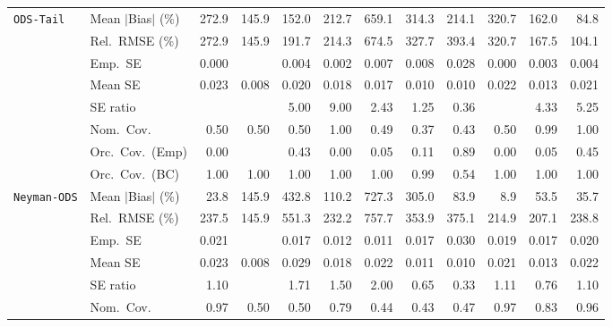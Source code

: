 \begin{landscape}
\begin{longtable}{llrrrrrrrrrr}
\addlinespace[2pt]
\quad \texttt{ODS-Tail} & Mean $|$Bias$|$ (\%) & 272.9 & \cellcolor{ranktwo}145.9 & \cellcolor{rankthree}152.0 & 212.7 & 659.1 & 314.3 & 214.1 & 320.7 & 162.0 & \cellcolor{rankone}84.8 \\
 & Rel.\ RMSE (\%) & 272.9 & \cellcolor{ranktwo}145.9 & 191.7 & 214.3 & 674.5 & 327.7 & 393.4 & 320.7 & \cellcolor{rankthree}167.5 & \cellcolor{rankone}104.1 \\
 & Emp.\ SE & 0.000 &  & 0.004 & 0.002 & 0.007 & 0.008 & 0.028 & 0.000 & 0.003 & 0.004 \\
 & Mean SE & 0.023 & 0.008 & 0.020 & 0.018 & 0.017 & 0.010 & 0.010 & 0.022 & 0.013 & 0.021 \\
 & SE ratio &  &  & 5.00 & 9.00 & \cellcolor{rankthree}2.43 & \cellcolor{rankone}1.25 & \cellcolor{ranktwo}0.36 &  & 4.33 & 5.25 \\
 & Nom.\ Cov. & \cellcolor{rankthree}0.50 & \cellcolor{rankthree}0.50 & \cellcolor{rankthree}0.50 & \cellcolor{ranktwo}1.00 & 0.49 & 0.37 & 0.43 & \cellcolor{rankthree}0.50 & \cellcolor{rankone}0.99 & \cellcolor{ranktwo}1.00 \\
 & Orc.\ Cov.\ (Emp) & 0.00 &  & \cellcolor{rankthree}0.43 & 0.00 & 0.05 & 0.11 & \cellcolor{rankone}0.89 & 0.00 & 0.05 & \cellcolor{ranktwo}0.45 \\
 & Orc.\ Cov.\ (BC) & \cellcolor{ranktwo}1.00 & \cellcolor{ranktwo}1.00 & \cellcolor{ranktwo}1.00 & \cellcolor{ranktwo}1.00 & \cellcolor{ranktwo}1.00 & \cellcolor{rankone}0.99 & \cellcolor{rankthree}0.54 & \cellcolor{ranktwo}1.00 & \cellcolor{ranktwo}1.00 & \cellcolor{ranktwo}1.00 \\
\addlinespace[2pt]
\quad \texttt{Neyman-ODS} & Mean $|$Bias$|$ (\%) & \cellcolor{ranktwo}23.8 & 145.9 & 432.8 & 110.2 & 727.3 & 305.0 & 83.9 & \cellcolor{rankone}8.9 & 53.5 & \cellcolor{rankthree}35.7 \\
 & Rel.\ RMSE (\%) & 237.5 & \cellcolor{rankone}145.9 & 551.3 & 232.2 & 757.7 & 353.9 & 375.1 & \cellcolor{rankthree}214.9 & \cellcolor{ranktwo}207.1 & 238.8 \\
 & Emp.\ SE & 0.021 &  & 0.017 & 0.012 & 0.011 & 0.017 & 0.030 & 0.019 & 0.017 & 0.020 \\
 & Mean SE & 0.023 & 0.008 & 0.029 & 0.018 & 0.022 & 0.011 & 0.010 & 0.021 & 0.013 & 0.022 \\
 & SE ratio & \cellcolor{rankone}1.10 &  & 1.71 & 1.50 & 2.00 & 0.65 & 0.33 & \cellcolor{ranktwo}1.11 & \cellcolor{rankthree}0.76 & \cellcolor{rankone}1.10 \\
 & Nom.\ Cov. & \cellcolor{ranktwo}0.97 & 0.50 & 0.50 & 0.79 & 0.44 & 0.43 & 0.47 & \cellcolor{ranktwo}0.97 & \cellcolor{rankthree}0.83 & \cellcolor{rankone}0.96 \\

\end{longtable}
\end{landscape}
